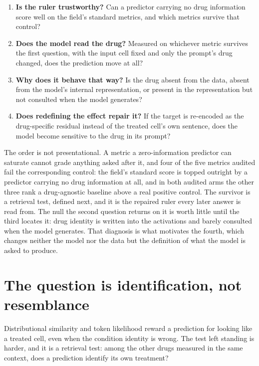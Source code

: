 \begin{enumerate}
  \item \textbf{Is the ruler trustworthy?} Can a predictor carrying no drug
        information score well on the field's standard metrics, and which
        metrics survive that control?
  \item \textbf{Does the model read the drug?} Measured on whichever metric
        survives the first question, with the input cell fixed and only the
        prompt's drug changed, does the prediction move at all?
  \item \textbf{Why does it behave that way?} Is the drug absent from the data,
        absent from the model's internal representation, or present in the
        representation but not consulted when the model generates?
  \item \textbf{Does redefining the effect repair it?} If the target is
        re-encoded as the drug-specific residual instead of the treated cell's
        own sentence, does the model become sensitive to the drug in its prompt?
\end{enumerate}

\noindent
The order is not presentational. A metric a zero-information predictor can
saturate cannot grade anything asked after it, and four of the five metrics
audited fail the corresponding control: the field's standard score is topped
outright by a predictor carrying no drug information at all, and in both audited
arms the other three rank a drug-agnostic baseline above a real positive
control. The survivor is a retrieval
test, defined next, and it is the repaired ruler every later answer is read
from. The null the second question returns on it is worth little until the third
locates it: drug identity is written into the activations and barely consulted
when the model generates. That diagnosis is what motivates the fourth, which
changes neither the model nor the data but the definition of what the model is
asked to produce.

\section{The question is identification, not resemblance}
\label{sec:intro-question}

Distributional similarity and token likelihood reward a prediction for looking
like a treated cell, even when the condition identity is wrong. The test left
standing is harder, and it is a retrieval test: among the other drugs measured
in the same context, does a prediction identify its own treatment?

